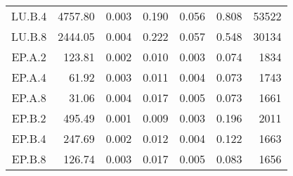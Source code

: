 \begin{longtable}[c]{c*{6}{r}}
  LU.B.4                       & 4757.80                      & 0.003                        & 0.190                      & 0.056                        & 0.808 & 53522  \\
  LU.B.8                       & 2444.05                      & 0.004                        & 0.222                      & 0.057                        & 0.548 & 30134  \\
  EP.A.2                       & 123.81                       & 0.002                        & 0.010                      & 0.003                        & 0.074 & 1834   \\
  EP.A.4                       & 61.92                        & 0.003                        & 0.011                      & 0.004                        & 0.073 & 1743   \\
  EP.A.8                       & 31.06                        & 0.004                        & 0.017                      & 0.005                        & 0.073 & 1661   \\
  EP.B.2                       & 495.49                       & 0.001                        & 0.009                      & 0.003                        & 0.196 & 2011   \\
  EP.B.4                       & 247.69                       & 0.002                        & 0.012                      & 0.004                        & 0.122 & 1663   \\
  EP.B.8                       & 126.74                       & 0.003                        & 0.017                      & 0.005                        & 0.083 & 1656   \\
  \bottomrule[1.5pt]
\end{longtable}

